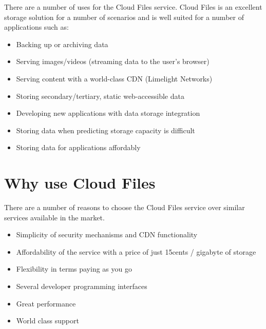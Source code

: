 \documentclass[letterpaper,10pt,english]{manual}
\begin{document}
There are a number of uses for the Cloud Files service. Cloud Files is an
excellent storage solution for a number of scenarios and is well suited
for a number of applications such as:
\begin{itemize}
\item {} 
Backing up or archiving data

\item {} 
Serving images/videos (streaming data to the user's browser)

\item {} 
Serving content with a world-class CDN (Limelight Networks)

\item {} 
Storing secondary/tertiary, static web-accessible data

\item {} 
Developing new applications with data storage integration

\item {} 
Storing data when predicting storage capacity is difficult

\item {} 
Storing data for applications affordably

\end{itemize}


\chapter{Why use Cloud Files}

There are a number of reasons to choose the Cloud Files service over
similar services available in the market.
\begin{itemize}
\item {} 
Simplicity of security mechanisms and CDN functionality

\item {} 
Affordability of the service with a price of just 15cents / gigabyte of storage

\item {} 
Flexibility in terms paying as you go

\item {} 
Several developer programming interfaces

\item {} 
Great performance

\item {} 
World class support

\end{itemize}
\end{document}
